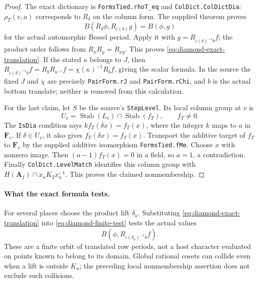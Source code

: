 \documentclass[11pt,a4paper]{article}
\theoremstyle{definition}
\theoremstyle{remark}
\begin{document}
\begin{proof}
The exact dictionary is
\texttt{FormsTied.rhoT\_eq} and \texttt{ColDict.ColDictDia}:
$\rho_T(v,a)$ corresponds to $R_\delta$ on the column form.
The supplied theorem  proves
\[
 B(R_\delta\phi,R_{\iota(\delta)}g)=B(\phi,g)
\]
for the actual automorphic Bessel period.  Apply it with
$g=R_{\iota(\delta)^{-1}b}f$; the product order follows from
$R_xR_y=R_{xy}$.  This proves
\eqref{eq:diamond-exact-translation}.  If the stated $\kappa$
belongs to $J$, then
$R_{\iota(\delta)^{-1}b}f=R_bR_{\kappa^{-1}}f
=\chi(\kappa)^{-1}R_bf$, giving the scalar formula.  In the
source the fixed $J$ and $\chi$ are precisely \texttt{PairForm.rJ}
and \texttt{PairForm.rChi}, and $b$ is the actual bottom translate;
neither is removed from this calculation.

For the last claim, let $S$ be the source's \texttt{StepLevel}.
Its local column group at $v$ is
\[
 U_v=\operatorname{Stab}(L_v)\cap\operatorname{Stab}(f_T),
 \qquad f_T\ne0.
\]
The \texttt{IsDia} condition says
$k f_T(\delta x)=f_T(x)$, where the integer $k$ maps to $a$ in
$\mathbf F_v$.  If $\delta\in U_v$, it also gives
$f_T(\delta x)=f_T(x)$.  Transport the additive target of $f_T$
to $\mathbf F_v$ by the supplied additive isomorphism
\texttt{FormsTied.fMe}.  Choose $x$ with nonzero image.
Then $(a-1)f_T(x)=0$ in a field, so $a=1$, a contradiction.
Finally \texttt{ColDict.LevelMatch} identifies this column group
with $H(\mathbf A_f)\cap x_uK_2x_u^{-1}$.  This proves the claimed
nonmembership.
\end{proof}

\paragraph{What the exact formula tests.}
For several places choose the product lift $\delta_a$.
Substituting \eqref{eq:diamond-exact-translation} into
\eqref{eq:diamond-finite-test} tests the actual values
\[
 B(\phi,R_{\iota(\delta_a)^{-1}b}f).
\]
These are a finite orbit of translated row periods, not a host
character evaluated on points known to belong to its domain.
Global rational cosets can collide even when a lift is outside
$K_u$; the preceding local nonmembership assertion does not
exclude such collisions.
\end{document}
